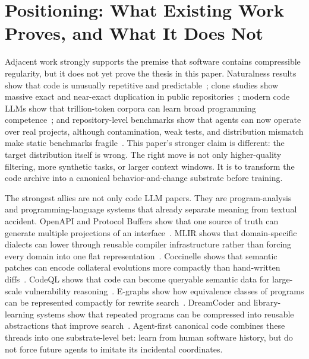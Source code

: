 \section{Positioning: What Existing Work Proves, and What It Does Not}

Adjacent work strongly supports the premise that software contains compressible regularity, but it does not yet prove the thesis in this paper. Naturalness results show that code is unusually repetitive and predictable~\cite{hindleNaturalness}; clone studies show massive exact and near-exact duplication in public repositories~\cite{dejavu2017,jupyterClones2020}; modern code LLMs show that trillion-token corpora can learn broad programming competence~\cite{starcoder2,qwenCoder,deepseekCoder,kimiK2}; and repository-level benchmarks show that agents can now operate over real projects, although contamination, weak tests, and distribution mismatch make static benchmarks fragile~\cite{swebench,swebenchVerified,sweRebench,utboost}. This paper's stronger claim is different: the target distribution itself is wrong. The right move is not only higher-quality filtering, more synthetic tasks, or larger context windows. It is to transform the code archive into a canonical behavior-and-change substrate before training.

The strongest allies are not only code LLM papers. They are program-analysis and programming-language systems that already separate meaning from textual accident. OpenAPI and Protocol Buffers show that one source of truth can generate multiple projections of an interface~\cite{openapi31,protobufOverview}. MLIR shows that domain-specific dialects can lower through reusable compiler infrastructure rather than forcing every domain into one flat representation~\cite{lattnerMLIR}. Coccinelle shows that semantic patches can encode collateral evolutions more compactly than hand-written diffs~\cite{coccinelle}. CodeQL shows that code can become queryable semantic data for large-scale vulnerability reasoning~\cite{codeql}. E-graphs show how equivalence classes of programs can be represented compactly for rewrite search~\cite{eggEgraphs}. DreamCoder and library-learning systems show that repeated programs can be compressed into reusable abstractions that improve search~\cite{dreamcoder}. Agent-first canonical code combines these threads into one substrate-level bet: learn from human software history, but do not force future agents to imitate its incidental coordinates.

